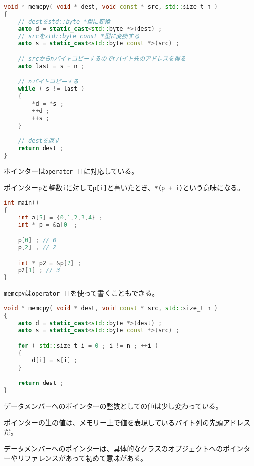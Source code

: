 \begin{lstlisting}[language={C++}]
void * memcpy( void * dest, void const * src, std::size_t n )
{
    // destをstd::byte *型に変換
    auto d = static_cast<std::byte *>(dest) ;
    // srcをstd::byte const *型に変換する
    auto s = static_cast<std::byte const *>(src) ;

    // srcからnバイトコピーするのでnバイト先のアドレスを得る 
    auto last = s + n ;

    // nバイトコピーする
    while ( s != last )
    {
        *d = *s ;
        ++d ;
        ++s ;
    }

    // destを返す
    return dest ;
}
\end{lstlisting}


ポインターは\texttt{operator []}に対応している。

ポインター\texttt{p}と整数\texttt{i}に対して\texttt{p[i]}と書いたとき、\texttt{*(p + i)}という意味になる。

\begin{lstlisting}[language={C++}]
int main()
{
    int a[5] = {0,1,2,3,4} ;
    int * p = &a[0] ;

    p[0] ; // 0
    p[2] ; // 2

    int * p2 = &p[2] ;
    p2[1] ; // 3
}
\end{lstlisting}

\texttt{memcpy}は\texttt{operator []}を使って書くこともできる。

\begin{lstlisting}[language={C++}]
void * memcpy( void * dest, void const * src, std::size_t n )
{
    auto d = static_cast<std::byte *>(dest) ;
    auto s = static_cast<std::byte const *>(src) ;

    for ( std::size_t i = 0 ; i != n ; ++i )
    {
        d[i] = s[i] ;
    }

    return dest ;
}
\end{lstlisting}

\clearpage
{}

データメンバーへのポインターの整数としての値は少し変わっている。

ポインターの生の値は、メモリー上で値を表現しているバイト列の先頭アドレスだ。

データメンバーへのポインターは、具体的なクラスのオブジェクトへのポインターやリファレンスがあって初めて意味がある。

